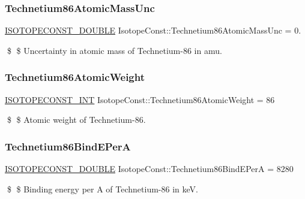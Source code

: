 \subsubsection{\texorpdfstring{Technetium86\+Atomic\+Mass\+Unc}{Technetium86AtomicMassUnc}}
{\footnotesize\ttfamily \mbox{\hyperlink{group___isotope_const-_macros_ga8f45a7272ce02c0b4c65c44636ed719a}{I\+S\+O\+T\+O\+P\+E\+C\+O\+N\+S\+T\+\_\+\+D\+O\+U\+B\+LE}} Isotope\+Const\+::\+Technetium86\+Atomic\+Mass\+Unc = 0.}

\$ \$ Uncertainty in atomic mass of Technetium-\/86 in amu. \mbox{\label{group___isotope_const-_technetium-_tc86_gad13b4926c95a39ab90b65ead2f98da53}} 
\subsubsection{\texorpdfstring{Technetium86\+Atomic\+Weight}{Technetium86AtomicWeight}}
{\footnotesize\ttfamily \mbox{\hyperlink{group___isotope_const-_macros_ga5f18360b3e99483a35c32d789e62621c}{I\+S\+O\+T\+O\+P\+E\+C\+O\+N\+S\+T\+\_\+\+I\+NT}} Isotope\+Const\+::\+Technetium86\+Atomic\+Weight = 86}

\$ \$ Atomic weight of Technetium-\/86. \mbox{\label{group___isotope_const-_technetium-_tc86_ga3fb283224aaffb0043baed8102f973c0}} 
\subsubsection{\texorpdfstring{Technetium86\+Bind\+E\+PerA}{Technetium86BindEPerA}}
{\footnotesize\ttfamily \mbox{\hyperlink{group___isotope_const-_macros_ga8f45a7272ce02c0b4c65c44636ed719a}{I\+S\+O\+T\+O\+P\+E\+C\+O\+N\+S\+T\+\_\+\+D\+O\+U\+B\+LE}} Isotope\+Const\+::\+Technetium86\+Bind\+E\+PerA = 8280}

\$ \$ Binding energy per A of Technetium-\/86 in keV. \mbox{\label{group___isotope_const-_technetium-_tc86_ga0ad915f0296bb69e552ef378309a5b75}} 
